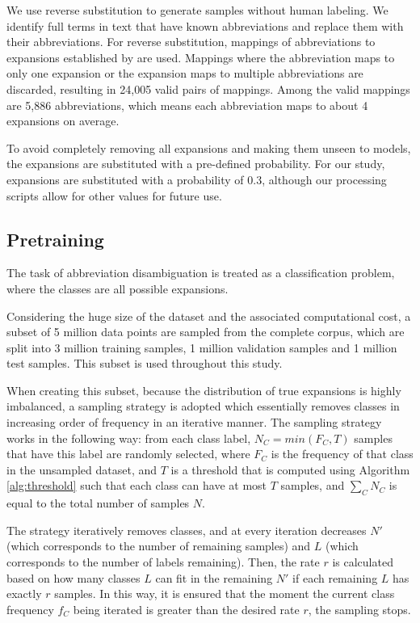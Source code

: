 \documentclass[11pt,a4paper]{article}
\begin{document}
We use reverse substitution \cite{Skreta2019TrainingDisambiguation} to generate samples without human labeling. We identify full terms in text that have known abbreviations and replace them with their abbreviations. For reverse substitution, mappings of abbreviations to expansions established by \citet{Zhou2006ADAM:MEDLINE} are used. Mappings where the abbreviation maps to only one expansion or the expansion maps to multiple abbreviations are discarded, resulting in 24,005 valid pairs of mappings. Among the valid mappings are 5,886 abbreviations, which means each abbreviation maps to about 4 expansions on average. 

To avoid completely removing all expansions and making them unseen to models, the expansions are substituted with a pre-defined probability. For our study, expansions are substituted with a probability of $0.3$, although our processing scripts allow for other values for future use. 

\subsection{Pretraining}

The task of abbreviation disambiguation is treated as a classification problem, where the classes are all possible expansions. 

Considering the huge size of the dataset and the associated computational cost, a subset of 5 million data points are sampled from the complete corpus, which are split into 3 million training samples, 1 million validation samples and 1 million test samples. This subset is used throughout this study.

When creating this subset, because the distribution of true expansions is highly imbalanced, a sampling strategy is adopted which essentially removes classes in increasing order of frequency in an iterative manner. The sampling strategy works in the following way: from each class label, $N_C = min(F_C, T)$ samples that have this label are randomly selected, where $F_C$ is the frequency of that class in the unsampled dataset, and $T$ is a threshold that is computed using Algorithm \ref{alg:threshold} such that each class can have at most $T$ samples, and $\sum_{C}N_C$ is equal to the total number of samples $N$.

The strategy iteratively removes classes, and at every iteration decreases $N'$ (which corresponds to the number of remaining samples) and $L$ (which corresponds to the number of labels remaining). Then, the rate $r$ is calculated based on how many classes $L$ can fit in the remaining $N'$ if each remaining $L$ has exactly $r$ samples. In this way, it is ensured that the moment the current class frequency $f_C$ being iterated is greater than the desired rate $r$, the sampling stops.
\end{document}

